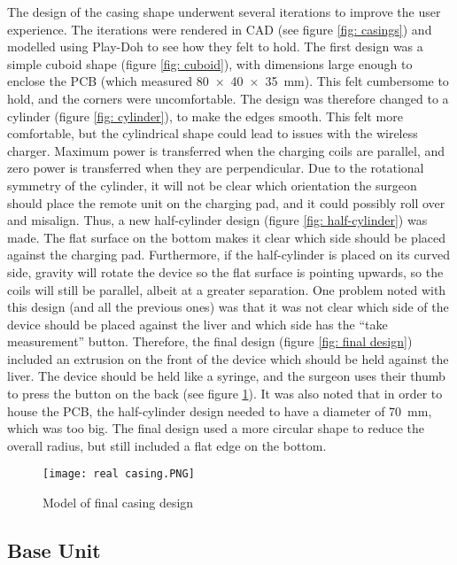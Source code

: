 The design of the casing shape underwent several iterations to improve the user experience. The iterations were rendered in CAD (see figure \ref{fig: casings}) and modelled using Play-Doh to see how they felt to hold. The first design was a simple cuboid shape (figure \ref{fig: cuboid}), with dimensions large enough to enclose the PCB (which measured \SI{80x40x35}{\milli\metre}). This felt cumbersome to hold, and the corners were uncomfortable. The design was therefore changed to a cylinder (figure \ref{fig: cylinder}), to make the edges smooth. This felt more comfortable, but the cylindrical shape could lead to issues with the wireless charger. Maximum power is transferred when the charging coils are parallel, and zero power is transferred when they are perpendicular. Due to the rotational symmetry of the cylinder, it will not be clear which orientation the surgeon should place the remote unit on the charging pad, and it could possibly roll over and misalign. Thus, a new half-cylinder design (figure \ref{fig: half-cylinder}) was made. The flat surface on the bottom makes it clear which side should be placed against the charging pad. Furthermore, if the half-cylinder is placed on its curved side, gravity will rotate the device so the flat surface is pointing upwards, so the coils will still be parallel, albeit at a greater separation. One problem noted with this design (and all the previous ones) was that it was not clear which side of the device should be placed against the liver and which side has the ``take measurement'' button. Therefore, the final design (figure \ref{fig: final design}) included an extrusion on the front of the device which should be held against the liver. The device should be held like a syringe, and the surgeon uses their thumb to press the button on the back (see figure \ref{fig: real casing}). It was also noted that in order to house the PCB, the half-cylinder design needed to have a diameter of \SI{70}{\milli\metre}, which was too big. The final design used a more circular shape to reduce the overall radius, but still included a flat edge on the bottom.

\begin{figure}[htb]
	\centering
	\texttt{[image: real casing.PNG]}
	\caption{Model of final casing design}
	\label{fig: real casing}
\end{figure}





\subsection{Base Unit}\label{base casing}


